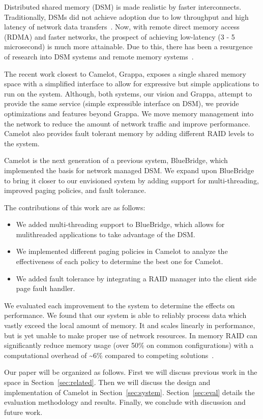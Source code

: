 Distributed shared memory (DSM) is made realistic by faster interconnects.
Traditionally, DSMs did not achieve adoption due to low throughput and high
latency of network data transfers~\cite{Li1989}. Now, with remote direct memory
access (RDMA) and faster networks, the prospect of achieving low-latency (3 - 5
microsecond) is much more attainable. Due to this, there has been a resurgence
of research into DSM systems and remote memory systems~\cite{Ongaro2011,Nelson2015,Dragojevic2014}. 

The recent work closest to Camelot, Grappa, exposes a single shared memory
space with a simplified interface to allow for expressive but simple
applications to run on the system. Although, both systems, our vision and
Grappa, attempt to provide the same service (simple expressible interface on
DSM), we provide optimizations and features beyond Grappa. We move memory
management into the network to reduce the amount of network traffic and improve
performance. Camelot also provides fault tolerant memory by adding different
RAID levels to the system. 

Camelot is the next generation of a previous system, BlueBridge, which
implemented the basis for network managed DSM. We expand upon BlueBridge to
bring it closer to our envisioned system by adding support for multi-threading,
improved paging policies, and fault tolerance.

The contributions of this work are as follows:
\begin{itemize}
	\item We added multi-threading support to BlueBridge, which allows for
	mulithreaded applications to take advantage of the DSM.
	\item We implemented different paging policies in Camelot to analyze the
	effectiveness of each policy to determine the best one for Camelot.
	\item We added fault tolerance by integrating a RAID manager into the client side page fault handler.
        
\end{itemize}

We evaluated each improvement to the system to determine the effects on
performance. We found that our system is able to reliably process data which vastly exceed the local 
amount of memory. It and scales linearly in performance, but is yet unable to make proper use of 
network resources. In memory RAID can significantly reduce memory usage
(over 50\% on common configurations) with a computational overhead of \textasciitilde6\%
compared to competing solutions~\cite{Ousterhout:2015:RSS:2818727.2806887}.

Our paper will be organized as follows. First we will discuss previous work in
the space in Section~\ref{sec:related}. Then we will discuss the design and
implementation of Camelot in Section~\ref{sec:system}. Section~\ref{sec:eval}
details the evaluation methodology and results. Finally, we conclude with
discussion and future work. 
